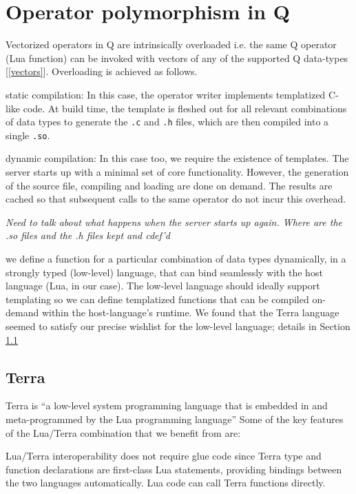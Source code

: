 \section{Operator polymorphism in Q}
\label{polymorphism}

Vectorized operators in Q are intrinsically overloaded i.e. the same Q operator (Lua function) can be invoked with vectors of any of the supported Q data-types [\ref{vectors}].
Overloading is achieved as follows.
\be
\item static compilation: In this case, the operator writer implements
  templatized C-like code. At build time, the template is fleshed out for all
  relevant combinations of data types to generate the \verb+.c+ and \verb+.h+
  files, which are then compiled into a single \verb+.so+.
\item dynamic compilation: 
  In this case too, we require the existence of templates. 
  The server starts up with a minimal set of core functionality. 
  However, the generation of the source file, compiling and loading
  are done on demand. The results are cached
  so that subsequent calls to the same operator do not incur this overhead.

  {\em Need to talk about what happens when  the server starts up again. Where
  are the .so files and the .h files kept and cdef'd}

\item we define a function for a particular combination of data types
  dynamically, in a strongly typed (low-level) language, that can bind seamlessly
  with the host language (Lua, in our case). The low-level language should ideally support templating so we can define templatized functions that can be compiled on-demand within the host-language's runtime.
  We found that the Terra language seemed to satisfy our precise wishlist for the low-level language; details in Section \ref{Terra} 
  \ee

\subsection{Terra} 
\label{Terra} 

Terra is ``a low-level system programming language that is embedded in and
meta-programmed by the Lua programming language'' \cite{devito15xx}
Some of the key features of the Lua/Terra combination that we benefit 
from are:
\be
\item Lua/Terra interoperability does not require glue code since Terra type and function declarations are first-class Lua statements, providing bindings between the two languages automatically. Lua code can call Terra functions directly.

